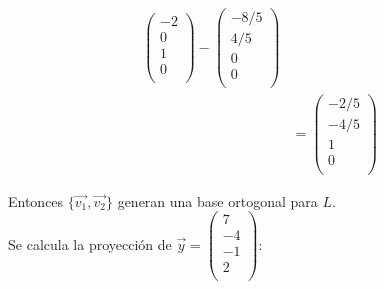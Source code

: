 \documentclass[12pt,a4paper]{report}
\begin{document}
\begin{enumerate}
\begin{enumerate}
\begin{align*}
\begin{pmatrix}
-2\\
0\\
1\\
0\\
\end{pmatrix}-\begin{pmatrix}
-8/5\\
4/5\\
0\\
0\\
\end{pmatrix}\\
&=\begin{pmatrix}
-2/5\\
-4/5\\
1\\
0\\
\end{pmatrix}
\end{align*}

Entonces $\lbrace\vec{v_{1}},\vec{v_{2}}\rbrace$ generan una base ortogonal para $L$.\\



Se calcula la proyección de $\vec{y}=\begin{pmatrix}
7\\
-4\\
-1\\
2\\
\end{pmatrix}$:\\


\end{enumerate}
\end{enumerate}
\end{document}
